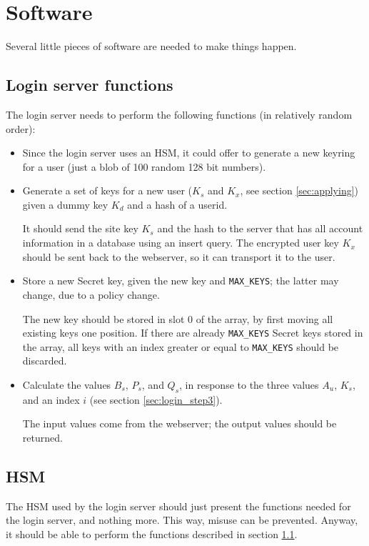 \section{Software}
Several little pieces of software are needed to make things happen.

\subsection{Login server functions}
\label{sec:login_server_functions}
The login server needs to perform the following functions (in relatively random order):
\begin{itemize}
\item Since the login server uses an HSM,
it could offer to generate a new keyring for a user
(just a blob of 100 random 128 bit numbers).
\item Generate a set of keys for a new user ($K_s$ and $K_x$,
see section \ref{sec:applying}) given a dummy key $K_d$ and a \SHA hash of a userid.
\par
It should send the site key $K_s$ and the hash to the server that has all account information in a database using an insert query.
The encrypted user key $K_x$ should be sent back to the webserver, so it can transport it to the user.
\item Store a new Secret key,
given the new key and \texttt{MAX\_KEYS};
the latter may change,
due to a policy change.
\par
The new key should be stored in slot 0 of the array, by first moving all existing keys one position.
If there are already \texttt{MAX\_KEYS} Secret keys stored in the array,
all keys with an index greater or equal to \texttt{MAX\_KEYS} should be discarded.
\item Calculate the values $B_s$, $P_s$, and $Q_s$,
in response to the three values $A_u$, $K_s$,
and an index $i$ (see section \ref{sec:login_step3}).
\par The input values come from the webserver;
the output values should be returned.
\end{itemize}

\subsection{HSM}
The HSM used by the login server should just present the functions needed for the login server,
and nothing more.
This way,
misuse can be prevented.
Anyway, it should be able to perform the functions described in section \ref{sec:login_server_functions}.

